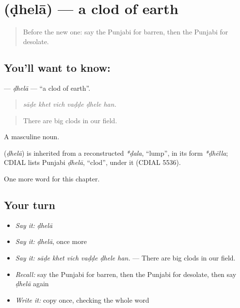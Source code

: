 \section[\texorpdfstring{\pa{ਢੇਲਾ} (ḍhelā)}{ਢੇਲਾ (ḍhelā)}]{ (ḍhelā) — a clod of earth}

\label{lesson:PA-C294-dhela}



\begin{quote}
Before the new one: say the Punjabi for barren, then the Punjabi for desolate.
\end{quote}

\subsection*{You'll want to know: }
\textbf{} — \emph{ḍhelā} — \textquotedblleft{}a clod of earth\textquotedblright{}.

\begin{quote}
     
\end{quote}

\begin{quote}
\emph{sāḍe khet vich vaḍḍe ḍhele han.}
\end{quote}

\begin{quote}
There are big clods in our field.
\end{quote}

A masculine noun.

\begin{cousinweb}
\textbf{} (\emph{ḍhelā}) is inherited from a reconstructed \emph{*ḍala}, \textquotedblleft{}lump\textquotedblright{}, in its form \emph{*ḍhēlla}; CDIAL lists Punjabi \emph{ḍhelā}, \textquotedblleft{}clod\textquotedblright{}, under it (CDIAL 5536).
\end{cousinweb}

\begin{grammarlens}[title={What you've built}]
One more word for this chapter.
\end{grammarlens}

\subsection*{Your turn}
\begin{itemize}
\raggedright
  \item \emph{Say it:} \emph{ḍhelā}
  \item \emph{Say it:} \emph{ḍhelā}, once more
  \item \emph{Say it:} \emph{sāḍe khet vich vaḍḍe ḍhele han.} — There are big clods in our field.
  \item \emph{Recall:} say the Punjabi for barren, then the Punjabi for desolate, then say \emph{ḍhelā} again
  \item \emph{Write it:} copy \textbf{} once, checking the whole word
\end{itemize}

